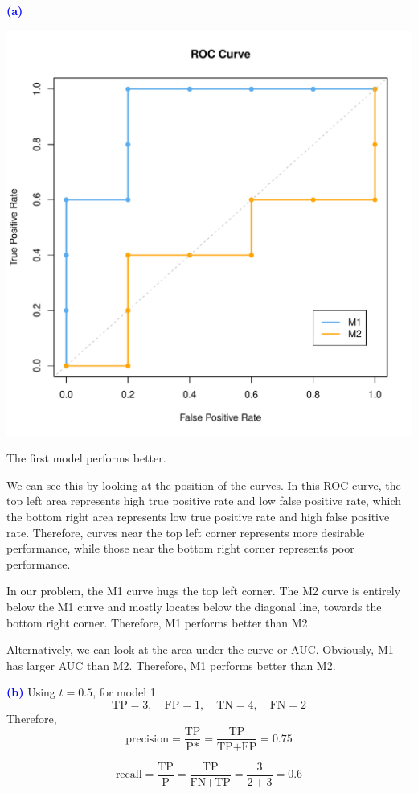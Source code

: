 \documentclass{article}
\newcommand{\qnum}[1]{\noindent\textcolor{blue}{\textbf{(#1)}}}
\newcommand{\tx}[1]{\text{#1}}
\begin{document}
\qnum{a}
\begin{center}
    \includegraphics[width=0.6\linewidth]{Images/ProbEC-a-ROC.pdf}
\end{center}

The first model performs better.

We can see this by looking at the position of the curves. 
In this ROC curve, the top left area represents high true positive rate and low false positive rate, which the bottom right area represents low true positive rate and high false positive rate. Therefore, curves near the top left corner represents more desirable performance, while those near the bottom right corner represents poor performance. 

In our problem, the M1 curve hugs the top left corner. The M2 curve is entirely below the M1 curve and mostly locates below the diagonal line, towards the bottom right corner. Therefore, M1 performs better than M2.

Alternatively, we can look at the area under the curve or AUC. Obviously, M1 has larger AUC than M2. Therefore, M1 performs better than M2.
\bigskip












\newcommand{\TP}{\tx{TP}}
\newcommand{\FP}{\tx{FP}}
\newcommand{\TN}{\tx{TN}}
\newcommand{\FN}{\tx{FN}}

\qnum{b}
Using $t=0.5$, for model 1
\[
    \TP = 3,\quad 
    \FP = 1,\quad 
    \TN = 4,\quad 
    \FN = 2
\]
Therefore, 
\[
    \tx{precision} 
    = \frac{\TP}{\tx{P*}}
    =\frac{\TP}{\TP + \FP}
    = 0.75
\]

\[
    \tx{recall} 
    = \frac{\TP}{\tx{P}}
    =\frac{\TP}{\FN + \TP}
    = \frac{3}{2 + 3}
    = 0.6
\]
\end{document}
